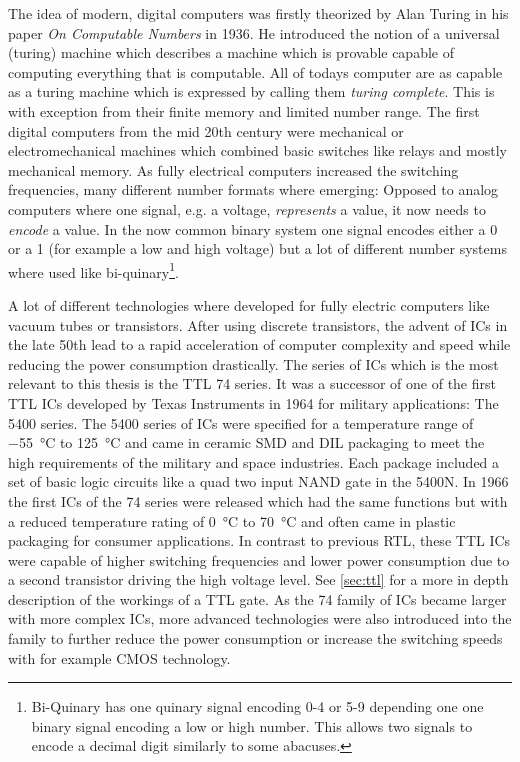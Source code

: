The idea of modern, digital computers was firstly theorized by Alan Turing in his paper \emph{On Computable Numbers} in 1936. \cite{10.1112/plms/s2-42.1.230}
He introduced the notion of a universal (turing) machine which describes a machine which is provable capable of computing everything that is computable.
All of todays computer are as capable as a turing machine which is expressed by calling them \emph{turing complete}.
This is with exception from their finite memory and limited number range.
The first digital computers from the mid 20th century were mechanical or electromechanical machines which combined basic switches like relays and mostly mechanical memory.
As fully electrical computers increased the switching frequencies, many different number formats where emerging:
Opposed to analog computers where one signal, e.g. a voltage, \emph{represents} a value, it now needs to \emph{encode} a value.
In the now common binary system one signal encodes either a 0 or a 1 (for example a low and high voltage) but a lot of different number systems where used like bi-quinary\footnote{Bi-Quinary has one quinary signal encoding 0-4 or 5-9 depending one one binary signal encoding a low or high number. This allows two signals to encode a decimal digit similarly to some abacuses.}.

A lot of different technologies where developed for fully electric computers like vacuum tubes or transistors.
After using discrete transistors, the advent of \glspl{IC} in the late 50th lead to a rapid acceleration of computer complexity and speed while reducing the power consumption drastically.
The series of \glspl{IC} which is the most relevant to this thesis is the \gls{TTL} 74 series.
It was a successor of one of the first \gls{TTL} \glspl{IC} developed by Texas Instruments in 1964 for military applications: The 5400 series. \cite{ICs}
The 5400 series of \glspl{IC} were specified for a temperature range of \qty{-55}{\celsius} to \qty{+125}{\celsius} and came in ceramic \gls{SMD} and \gls{DIL} packaging to meet the high requirements of the military and space industries.
Each package included a set of basic logic circuits like a quad two input NAND gate in the 5400N.
In 1966 the first \glspl{IC} of the 74 series were released which had the same functions but with a reduced temperature rating of \qty{0}{\celsius} to \qty{+70}{\celsius} and often came in plastic packaging for consumer applications.
In contrast to previous \gls{RTL}, these \gls{TTL} \glspl{IC} were capable of higher switching frequencies and lower power consumption due to a second transistor driving the high voltage level.
See \cref{sec:ttl} for a more in depth description of the workings of a \gls{TTL} gate.
As the 74 family of \glspl{IC} became larger with more complex \glspl{IC}, more advanced technologies were also introduced into the family to further reduce the power consumption or increase the switching speeds with for example \gls{CMOS} technology.

